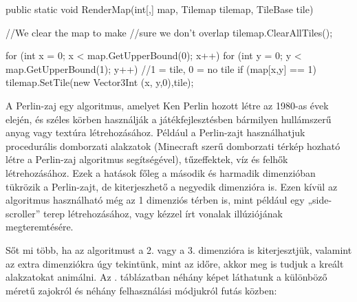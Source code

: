 \begin{java}
public static void RenderMap(int[,] map, 
    Tilemap tilemap, TileBase tile)
{
    //We clear the map to make
    //sure we don't overlap
    tilemap.ClearAllTiles();

    for (int x = 0; x < 
        map.GetUpperBound(0); x++)
    {
        for (int y = 0; y < 
            map.GetUpperBound(1); y++)
        {
            //1 = tile, 0 = no tile
            if (map[x,y] == 1)
            {
                tilemap.SetTile(new Vector3Int
                    (x, y,0),tile);
            }
        }
    }
}
\end{java}


A Perlin-zaj egy algoritmus, amelyet Ken Perlin hozott létre az 1980-as évek elején, és széles körben használják a játékfejlesztésben bármilyen hullámszerű anyag vagy textúra létrehozásához. Például a Perlin-zajt használhatjuk procedurális domborzati alakzatok (Minecraft szerű domborzati térkép hozható létre a Perlin-zaj algoritmus segítségével), tűzeffektek, víz és felhők létrehozásához. Ezek a hatások főleg a második és harmadik dimenzióban tükrözik a Perlin-zajt, de kiterjeszhető a negyedik dimenzióra is. Ezen kívül az algoritmus használható még az 1 dimenziós térben is, mint például egy „side-scroller” terep létrehozásához, vagy kézzel írt vonalak illúziójának megteremtésére.\cite{perlin2}

Sőt mi több, ha az algoritmust a 2. vagy a 3. dimenzióra is kiterjesztjük, valamint az extra dimenziókra úgy tekintünk, mint az időre, akkor meg is tudjuk a kreált alakzatokat animálni. Az . táblázatban néhány képet láthatunk a különböző méretű zajokról és néhány felhasználási módjukról futás közben:\cite{perlin1}

